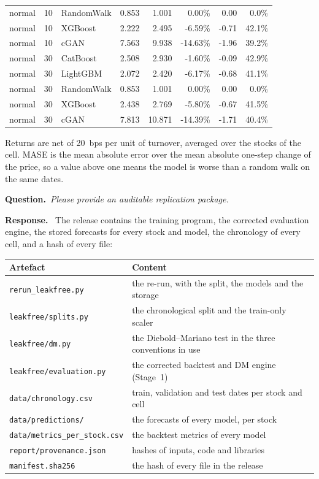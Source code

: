 \documentclass[11pt,a4paper]{article}
\newcommand{\subpoint}[3]{\par\vspace{0.9em}\Needspace{6\baselineskip}%
    \noindent{\bfseries Point #1: #2}\par\nopagebreak\vspace{0.15em}
    \noindent\textbf{Question.}\ \emph{#3}\par\nopagebreak\vspace{0.2em}
    \noindent\textbf{Response.}\ }
\begin{document}
\begin{center}
\begin{tabular}{lrlrrrrr}
normal & 10 & RandomWalk & 0.853 & 1.001 & 0.00\% & 0.00 & 0.0\% \\
normal & 10 & XGBoost & 2.222 & 2.495 & -6.59\% & -0.71 & 42.1\% \\
normal & 10 & cGAN & 7.563 & 9.938 & -14.63\% & -1.96 & 39.2\% \\
\addlinespace
normal & 30 & CatBoost & 2.508 & 2.930 & -1.60\% & -0.09 & 42.9\% \\
normal & 30 & LightGBM & 2.072 & 2.420 & -6.17\% & -0.68 & 41.1\% \\
normal & 30 & RandomWalk & 0.853 & 1.001 & 0.00\% & 0.00 & 0.0\% \\
normal & 30 & XGBoost & 2.438 & 2.769 & -5.80\% & -0.67 & 41.5\% \\
normal & 30 & cGAN & 7.813 & 10.871 & -14.39\% & -1.71 & 40.4\% \\
\bottomrule
\end{tabular}
\end{center}

Returns are net of 20~bps per unit of turnover, averaged over the stocks
of the cell. MASE is the mean absolute error over the mean absolute
one-step change of the price, so a value above one means the model is
worse than a random walk on the same dates.

\subpoint{1.6}{The replication package}{Please provide an auditable replication package.}
The release contains the training program, the corrected evaluation
engine, the stored forecasts for every stock and model, the chronology of
every cell, and a hash of every file:

\begin{center}\small
\begin{tabular}{p{}p{}}
\toprule
Artefact & Content \\
\midrule
\texttt{rerun\_leakfree.py} & the re-run, with the split, the models and the storage \\
\texttt{leakfree/splits.py} & the chronological split and the train-only scaler \\
\texttt{leakfree/dm.py} & the Diebold--Mariano test in the three conventions in use \\
\texttt{leakfree/evaluation.py} & the corrected backtest and DM engine (Stage~1) \\
\texttt{data/chronology.csv} & train, validation and test dates per stock and cell \\
\texttt{data/predictions/} & the forecasts of every model, per stock \\
\texttt{data/metrics\_per\_stock.csv} & the backtest metrics of every model \\
\texttt{report/provenance.json} & hashes of inputs, code and libraries \\
\texttt{manifest.sha256} & the hash of every file in the release \\
\bottomrule
\end{tabular}
\end{center}
\end{document}
